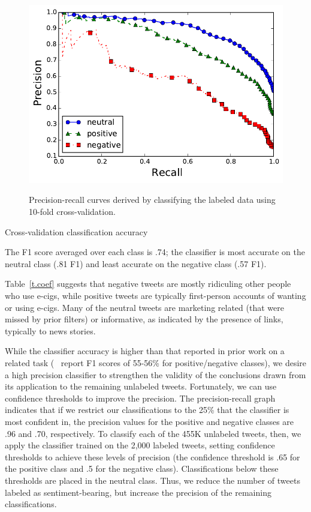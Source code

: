 \documentclass{sig-alternate}
\newcommand{\citenoun}[1]{{\citeauthor{#1}~\cite{#1}}}
\begin{document}
\begin{figure}[t]
\caption{Precision-recall curves derived by classifying the labeled data using 10-fold cross-validation.}
\includegraphics[width=\columnwidth]{nb/prec_rec.pdf}  %
\centering
\label{f.prec_rec}
\end{figure}

\begin{table}[t]
\caption{Cross-validation classification accuracy \label{t.measure}}
\centering

\end{table}




The F1 score averaged over each class is .74; the classifier is most accurate on the neutral class (.81 F1) and least accurate on the negative class (.57 F1).

Table~\ref{t.coef} suggests that negative tweets are mostly ridiculing other people who use e-cigs, while positive tweets are typically first-person accounts of wanting or using e-cigs. Many of the neutral tweets are marketing related (that were missed by prior filters) or informative, as indicated by the presence of links, typically to news stories.

While the classifier accuracy is higher than that reported in prior work on a
related task (\citenoun{godea2015analysis} report F1 scores of 55-56\% for
positive/negative classes), we desire a high precision classifier to
strengthen the validity of the conclusions drawn from its application to the
remaining unlabeled tweets. Fortunately, we can use confidence thresholds to
improve the precision. The precision-recall graph indicates that if we
restrict our classifications to the 25\% that the classifier is most confident
in, the precision values for the positive and negative classes are .96 and
.70, respectively. To classify each of the 455K unlabeled tweets, then, we
apply the classifier trained on the 2,000 labeled tweets, setting confidence
thresholds to achieve these levels of precision (the confidence threshold is
.65 for the positive class and .5 for the negative class). Classifications
below these thresholds are placed in the neutral class. Thus, we reduce the
number of tweets labeled as sentiment-bearing, but increase the precision of
the remaining classifications.
\end{document}
